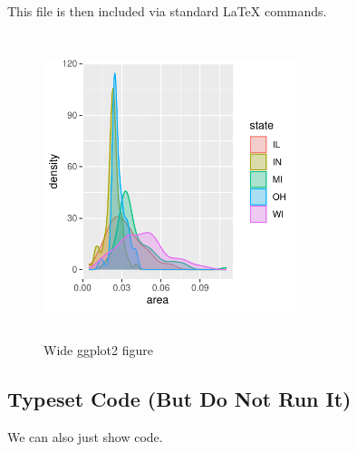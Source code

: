 \documentclass[letterpaper,10pt,twocolumn,twoside,]{pinp}
\begin{document}
\begin{Shaded}
\begin{Highlighting}[]
\OtherTok{\textless{}{-}} \NormalTok{(}
             \NormalTok{(}
                          \SpecialCharTok{+}
    \NormalTok{(} \NormalTok{)}
\NormalTok{(}\NormalTok{(}
\end{Highlighting}
\end{Shaded}

This file is then included via standard LaTeX commands.

\begin{figure}
  \begin{center}
    \includegraphics[width=0.66\textwidth, height=3.5in]{densities} 
  \end{center}
  \caption{Wide ggplot2 figure}\label{fig}
\end{figure}

\hypertarget{typeset-code-but-do-not-run-it}{%
\subsection{Typeset Code (But Do Not Run
It)}\label{typeset-code-but-do-not-run-it}}

We can also just show code.
\end{document}
